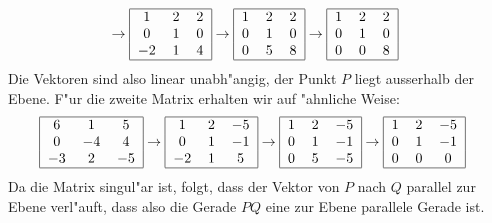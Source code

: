 \begin{loesung}
\begin{align*}
&\rightarrow
\begin{tabular}{|ccc|}
\hline
1&2&2\\
0&1&0\\
$-2$&1&4\\
\hline
\end{tabular}
\rightarrow
\begin{tabular}{|ccc|}
\hline
1&2&2\\
0&1&0\\
0&5&8\\
\hline
\end{tabular}
\rightarrow
\begin{tabular}{|ccc|}
\hline
1&2&2\\
0&1&0\\
0&0&8\\
\hline
\end{tabular}
\end{align*}
Die Vektoren sind also linear unabh"angig, der Punkt $P$ liegt ausserhalb
der Ebene. F"ur die zweite Matrix erhalten wir auf "ahnliche Weise:
\begin{align*}
\begin{tabular}{|ccc|}
\hline
6&1&5\\
0&$-4$&4\\
$-3$&2&$-5$\\
\hline
\end{tabular}
&\rightarrow
\begin{tabular}{|ccc|}
\hline
1&2&$-5$\\
0&1&$-1$\\
$-2$&1&5\\
\hline
\end{tabular}
\rightarrow
\begin{tabular}{|ccc|}
\hline
1&2&$-5$\\
0&1&$-1$\\
0&5&$-5$\\
\hline
\end{tabular}
\rightarrow
\begin{tabular}{|ccc|}
\hline
1&2&$-5$\\
0&1&$-1$\\
0&0&0\\
\hline
\end{tabular}
\end{align*}
Da die Matrix singul"ar ist, folgt, dass der Vektor von $P$ nach $Q$ parallel
zur Ebene verl"auft, dass also die Gerade $PQ$ eine zur Ebene parallele
Gerade ist.
\end{loesung}

